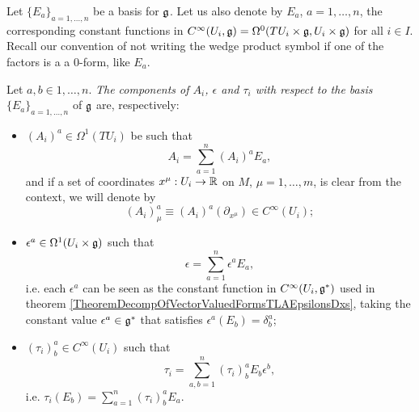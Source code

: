 \lin

Let $\{E_a\}_{a = 1, \dots, n}$ be a basis for $\mathfrak{g}$. Let us also denote by $E_a$, $a = 1, \dots, n$, the corresponding constant functions in $C^\infty(U_i, \mathfrak{g}) = \Omega^0(TU_i \times \mathfrak{g}, U_i \times \mathfrak{g})$ for all $i \in I$. Recall our convention of not writing the wedge product symbol if one of the factors is a a $0$-form, like $E_a$.

\begin{definition}
    Let $a, b \in 1, \dots, n$. \emph{The components of $A_i$, $\epsilon$ and $\tau_i$ with respect to the basis $\{E_a\}_{a = 1, \dots, n}$} of $\mathfrak{g}$ are, respectively: 
    
        \begin{itemize}
        
        \item $(A_i)^a \in \Omega^1(TU_i)$ be such that
            \begin{equation*}
                A_i = \sum_{a = 1}^n (A_i)^a E_a,
            \end{equation*}
        and if a set of coordinates $x^\mu: U_i \to \mathbb{R}$ on $M$, $\mu = 1, \dots, m$, is clear from the context, we will denote by
        \begin{equation}
            (A_i)^a_\mu \equiv (A_i)^a(\partial_{x^\mu}) \in C^\infty(U_i);
        \end{equation}
        
        \item $\epsilon^a \in \Omega^1(U_i \times \alg g)$ such that
            \begin{equation*}
                \epsilon = \sum_{a = 1}^n \epsilon^a E_a,
            \end{equation*}
        i.e. each $\epsilon^a$ can be seen as the constant function in $C^\infty(U_i, \mathfrak{g}^*)$ used in theorem \ref{TheoremDecompOfVectorValuedFormsTLAEpsilonsDxs}, taking the constant value $\epsilon^a \in \alg g^*$ that satisfies $\epsilon^a(E_b) = \delta^a_b$;
        
        \item $(\tau_i)^a_b \in C^\infty(U_i)$ such that
            \begin{equation*}
                \tau_i = \sum_{a, b = 1}^n (\tau_i)^a_b E_b \epsilon^b,
            \end{equation*}
        i.e. $\tau_i(E_b) = \sum_{a = 1}^n (\tau_i)^a_b E_a$.
        \end{itemize}
\end{definition}




